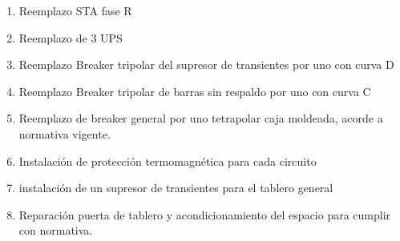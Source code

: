 \documentclass{article}
\begin{document}
\begin{enumerate}
    \item Reemplazo STA fase R
    \item Reemplazo de 3 UPS
    \item Reemplazo Breaker tripolar del supresor de transientes por uno con curva D
    \item Reemplazo Breaker tripolar de barras sin respaldo por uno con curva C
    \item Reemplazo de breaker general por uno tetrapolar caja moldeada, acorde a normativa vigente.
    \item Instalación de protección termomagnética para cada circuito
    \item instalación de un supresor de transientes para el tablero general
    \item Reparación puerta de tablero y acondicionamiento del espacio para cumplir con normativa.
\end{enumerate}
\end{document}
